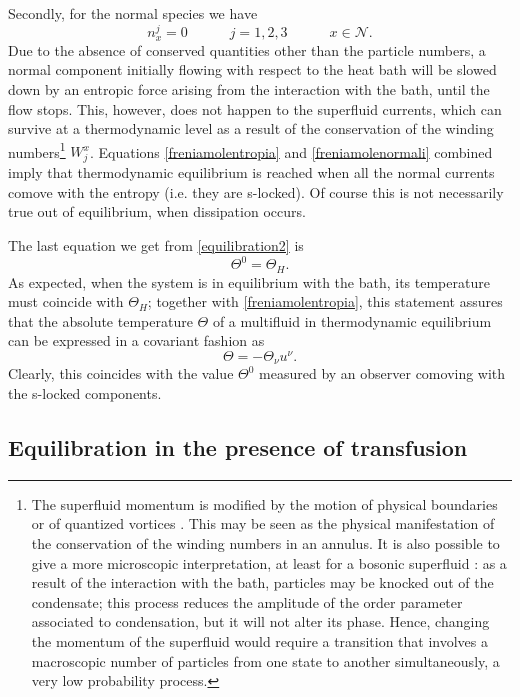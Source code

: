 \documentclass[usenatbib]{mnras}
\newcommand{\spc}{\quad \quad \quad}
\begin{document}
Secondly, for the normal species we have 
%
\begin{equation}\label{freniamolenormali}
n_x^j =0 \spc j=1,2,3 \spc x \in \mathcal{N}.
\end{equation}
%
Due to the absence of conserved quantities other than the particle numbers, a normal component initially flowing with respect to the heat bath will be slowed down by an entropic force arising from the interaction with the bath, until the flow stops. This, however, does not happen to the superfluid currents, which can survive at a thermodynamic level as a result of the conservation of the winding numbers\footnote{
The superfluid momentum is modified  by the motion of physical boundaries or of quantized vortices \citep{donnelly_book}. This may be seen as  the physical manifestation  of the conservation of the winding numbers in an annulus. It is also possible to give a more microscopic interpretation, at least for a bosonic superfluid \citep{NP_book}: as a result of the interaction with the bath, particles may be knocked out of the condensate; this process reduces the amplitude of the order parameter associated to condensation, but it will not alter its phase. Hence, changing the momentum of the superfluid would require a transition that involves a macroscopic number of particles from one state to another simultaneously, a very low probability process.
}  $W^x_j$.
Equations \eqref{freniamolentropia} and \eqref{freniamolenormali} combined imply that thermodynamic equilibrium is reached when all the normal currents comove with the entropy (i.e. they are s-locked). Of course this is not necessarily true out of equilibrium, when dissipation occurs. 

The last equation we get from \eqref{equilibration2} is
%
\begin{equation}
\label{temperiamolatemperatura}
\Theta^0 = \Theta_H.
\end{equation} 
%
As expected, when the system is in equilibrium with the bath, its temperature must coincide with $\Theta_H$; together with \eqref{freniamolentropia}, this statement assures that the absolute temperature $\Theta$ of a multifluid in thermodynamic equilibrium can be expressed in a covariant fashion as
%
\begin{equation}\label{temperiamolatemperatura2}
\Theta = -\Theta_\nu u^\nu .
\end{equation}
%
Clearly, this coincides with the value $\Theta^0$ measured by an observer comoving with the s-locked components.
 
\subsection{Equilibration in the presence of transfusion}\label{chemicandodurissimooo}
\end{document}

